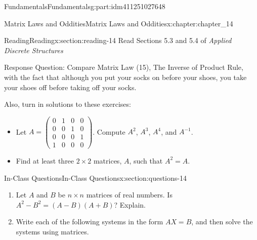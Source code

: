 \documentclass[oneside,10pt,]{book}
\numberwithin{equation}{section}
\begin{document}
\begin{partptx}{Fundamentals}{}{Fundamentals}{}{}{g:part:idm411251027648}
\typeout{************************************************}
%
\begin{chapterptx}{Matrix Laws and Oddities}{}{Matrix Laws and Oddities}{}{}{x:chapter:chapter_14}
\index{}%
%
%
\typeout{************************************************}
\typeout{************************************************}
%
\begin{sectionptx}{Reading}{}{Reading}{}{}{x:section:reading-14}
Read Sections 5.3 and 5.4 of \emph{Applied Discrete Structures}%
\par
Response Question: Compare Matrix Law (15), The Inverse of Product Rule, with the fact that although you put your socks on before your shoes, you take your shoes off before taking off your socks.%
\par
Also, turn in solutions to these exercises:%
\begin{itemize}[label=\textbullet]
\item{}Let \(A=\left(\begin{array}{cccc} 0 &1&0&0\\ 0 &0&1&0\\ 0&0&0&1\\ 1 &0&0&0 \end{array}\right)\). Compute \(A^2\), \(A^3\), \(A^4\), and \(A^{-1}\).%
\item{}Find at least three \(2\times2\) matrices, \(A\), such that \(A^2=A\).%
\end{itemize}
%
\end{sectionptx}
%
%
\typeout{************************************************}
\typeout{************************************************}
%
\begin{sectionptx}{In-Class Questions}{}{In-Class Questions}{}{}{x:section:questions-14}
%
\begin{enumerate}[label=\arabic*.]
\item{}Let \(A\) and \(B\) be \(n\times n\) matrices of real numbers. Is \(A^2-B^2= (A-B)(A+B)\)?  Explain.%
\item{}Write each of the following systems in the form \(A X = B\), and then solve the systems using matrices.%
\par
%
\begin{multicols}{2}
\end{multicols}
\end{enumerate}
\end{sectionptx}
\end{chapterptx}
\end{partptx}
\end{document}
